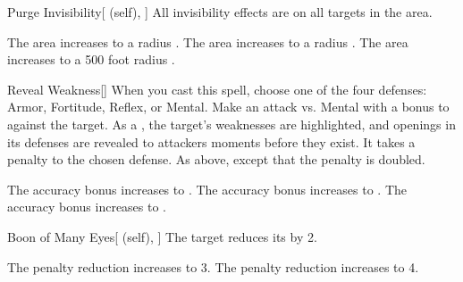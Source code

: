 \lowercase{\hypertarget{spell:Purge Invisibility}{}}\label{spell:Purge Invisibility}
\begin{attuneability}[Rank 2]{\hypertarget{spell:Purge Invisibility}{Purge Invisibility}}[ (self), ]
All invisibility effects are  on all targets in the area.

\rankline
{} The area increases to a \areahuge radius .
 The area increases to a \areaext radius .
 The area increases to a 500 foot radius .

\end{attuneability}
\vspace{0.25em}



\lowercase{\hypertarget{spell:Reveal Weakness}{}}\label{spell:Reveal Weakness}
\begin{freeability}[Rank 2]{\hypertarget{spell:Reveal Weakness}{Reveal Weakness}}[]
When you cast this spell, choose one of the four defenses: Armor, Fortitude, Reflex, or Mental.
Make an attack vs. Mental with a  bonus to  against the target.
\hit As a , the target's weaknesses are highlighted, and openings in its defenses are revealed to attackers moments before they exist.
It takes a  penalty to the chosen defense.
\crit As above, except that the penalty is doubled.

\rankline
{} The accuracy bonus increases to .
 The accuracy bonus increases to .
 The accuracy bonus increases to .

\end{freeability}
\vspace{0.25em}



\lowercase{\hypertarget{spell:Boon of Many Eyes}{}}\label{spell:Boon of Many Eyes}
\begin{attuneability}[Rank 3]{\hypertarget{spell:Boon of Many Eyes}{Boon of Many Eyes}}[ (self), ]
The target reduces its  by 2.

\rankline
{} The penalty reduction increases to 3.
 The penalty reduction increases to 4.

\end{attuneability}
\vspace{0.25em}



